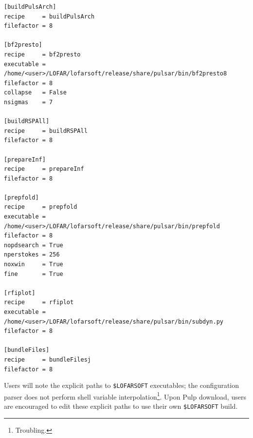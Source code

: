 \documentclass[a4paper,10pt,bibtotoc]{scrartcl}
\begin{document}
\begin{verbatim}
[buildPulsArch]
recipe     = buildPulsArch
filefactor = 8

[bf2presto]
recipe     = bf2presto
executable = /home/<user>/LOFAR/lofarsoft/release/share/pulsar/bin/bf2presto8
filefactor = 8
collapse   = False
nsigmas    = 7

[buildRSPAll]
recipe     = buildRSPAll
filefactor = 8

[prepareInf]
recipe     = prepareInf
filefactor = 8

[prepfold]
recipe     = prepfold
executable = /home/<user>/LOFAR/lofarsoft/release/share/pulsar/bin/prepfold
filefactor = 8
nopdsearch = True
nperstokes = 256
noxwin     = True
fine       = True

[rfiplot]
recipe     = rfiplot
executable = /home/<user>/LOFAR/lofarsoft/release/share/pulsar/bin/subdyn.py
filefactor = 8

[bundleFiles]
recipe     = bundleFilesj
filefactor = 8
\end{verbatim}
Users will note the explicit paths to \verb|$LOFARSOFT| executables; the configuration parser does not perform shell variable
interpolation\footnote{Troubling.}.  Upon Pulp download, users are encouraged to edit these explicit paths to use their own \verb|$LOFARSOFT| build.
\
\end{document}
